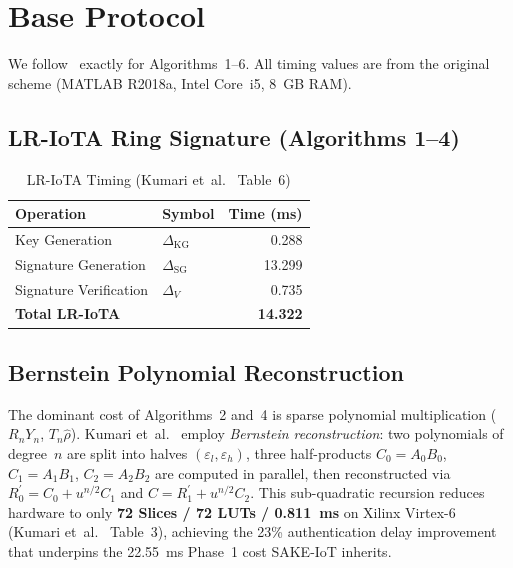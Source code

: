 \documentclass[conference]{IEEEtran}
\begin{document}
\section{Base Protocol}
\label{sec:base}

We follow~\cite{kumari2022} exactly for Algorithms~1--6. All timing
values are from the original scheme (MATLAB R2018a, Intel Core~i5, 8~GB
RAM).

\subsection{LR-IoTA Ring Signature (Algorithms 1--4)}

\begin{table}[!t]
\centering
\caption{LR-IoTA Timing (Kumari et~al.~\cite{kumari2022} Table~6)}
\label{tab:lriota}
\begin{tabular}{llr}
\toprule
\textbf{Operation} & \textbf{Symbol} & \textbf{Time (ms)} \\
\midrule
Key Generation & $\Delta_{\mathrm{KG}}$ & 0.288 \\
Signature Generation & $\Delta_{\mathrm{SG}}$ & 13.299 \\
Signature Verification & $\Delta_V$ & 0.735 \\
\midrule
\textbf{Total LR-IoTA} & & \textbf{14.322} \\
\bottomrule
\end{tabular}
\end{table}

\subsection{Bernstein Polynomial Reconstruction}

The dominant cost of Algorithms~2 and~4 is sparse polynomial multiplication
($R_nY_n$, $T_n\hat{\rho}$). Kumari et~al.~\cite{kumari2022} employ
\emph{Bernstein reconstruction}: two polynomials of degree~$n$ are split into
halves $(\varepsilon_l, \varepsilon_h)$, three half-products
$C_0{=}A_0B_0$, $C_1{=}A_1B_1$, $C_2{=}A_2B_2$ are computed in parallel,
then reconstructed via $R^{\prime}_0 = C_0 + u^{n/2}C_1$ and
$C = R^{\prime}_1 + u^{n/2}C_2$. This sub-quadratic recursion reduces
hardware to only \textbf{72 Slices / 72 LUTs / 0.811~ms} on Xilinx Virtex-6
(Kumari et~al.~\cite{kumari2022} Table~3), achieving the 23\% authentication
delay improvement that underpins the 22.55~ms Phase~1 cost SAKE-IoT inherits.
\end{document}
